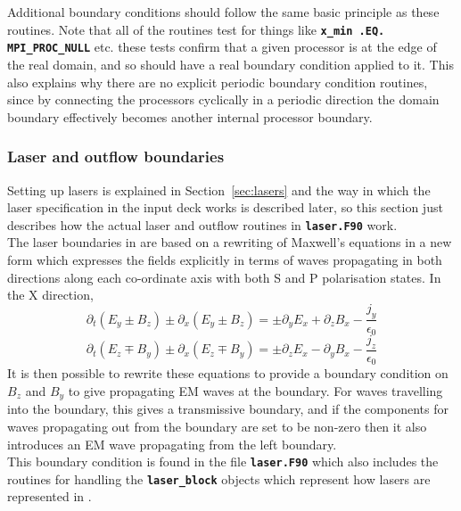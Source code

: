 \documentclass[12pt,a4paper]{article}
\newcommand{\inlinecode}[1]{{\color{warwickred} \bf\texttt{#1}}}
\newcommand{\sect}[1]{Section~\ref{sec:#1}}
\newcommand{\EPOCH}{{\color{warwickdark}\fontfamily{phv}\selectfont{EPOCH}}}
\begin{document}
Additional boundary conditions should follow the same basic principle as these
routines. Note that all of the routines test for things like \inlinecode{x\_min
.EQ. MPI\_PROC\_NULL} etc. these tests confirm that a given processor is at the
edge of the real domain, and so should have a real boundary condition applied
to it. This also explains why there are no explicit periodic boundary condition
routines, since by connecting the processors cyclically in a periodic direction
the domain boundary effectively becomes another internal processor boundary.

\subsubsection{Laser and outflow boundaries}
Setting up lasers is explained in \sect{lasers}
and the way in which the laser specification in the input deck works is
described later, so this section just describes how the actual laser and
outflow routines in \inlinecode{laser.F90} work.\\

The laser boundaries in {\EPOCH} are based on a rewriting of Maxwell's
equations in a new form which expresses the fields explicitly in terms of waves
propagating in both directions along each co-ordinate axis with both S and P
polarisation states. In the X direction,
\[
\partial_t(E_y \pm B_z) \pm \partial_x(E_y \pm B_z) = \pm \partial_yE_x
+ \partial_zB_x -\frac{j_y}{\epsilon_0}
\]
\[
\partial_t(E_z \mp B_y) \pm \partial_x(E_z \mp B_y) = \pm \partial_zE_x
- \partial_yB_x -\frac{j_z}{\epsilon_0}
\]
It is then possible to rewrite these equations to provide a boundary condition
on $B_z$ and $B_y$ to give propagating EM waves at the boundary. For waves
travelling into the boundary, this gives a transmissive boundary, and if the
components for waves propagating out from the boundary are set to be non-zero
then it also introduces an EM wave propagating from the left boundary.\\

This boundary condition is found in the file \inlinecode{laser.F90} which also
includes the routines for handling the \inlinecode{laser\_block} objects which
represent how lasers are represented in {\EPOCH}.
\end{document}
